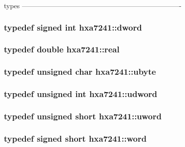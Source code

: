types ---------------------------------------------------------------------- 

\subsubsection{\setlength{\rightskip}{0pt plus 5cm}typedef signed int {\bf hxa7241::dword}}\label{namespacehxa7241_bcd38545952886f4718dd5f32b2c5a29}


\subsubsection{\setlength{\rightskip}{0pt plus 5cm}typedef double {\bf hxa7241::real}}\label{namespacehxa7241_59e97cee28216d10a7456904131c03e2}


\subsubsection{\setlength{\rightskip}{0pt plus 5cm}typedef unsigned char {\bf hxa7241::ubyte}}\label{namespacehxa7241_fab3e7e85b1e21a7f958fd1335a29267}


\subsubsection{\setlength{\rightskip}{0pt plus 5cm}typedef unsigned int {\bf hxa7241::udword}}\label{namespacehxa7241_2eca61fc527a2cb781fb2b30ab6a7196}


\subsubsection{\setlength{\rightskip}{0pt plus 5cm}typedef unsigned short {\bf hxa7241::uword}}\label{namespacehxa7241_4cdf1512ec5528bf1f7e620c3b02550e}


\subsubsection{\setlength{\rightskip}{0pt plus 5cm}typedef signed short {\bf hxa7241::word}}\label{namespacehxa7241_af2eb8e13a846666d2f01e67472f2315}




